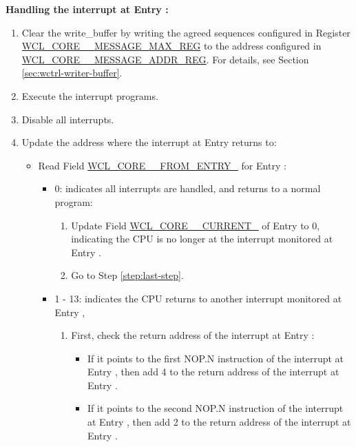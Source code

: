 \documentclass[main\_\_EN.tex]{subfiles}
\begin{document}
\textbf{Handling the interrupt at Entry : \label{step:wctrl-start-interrput}}
    \begin{enumerate}
        \item Clear the write\_buffer by writing the agreed sequences configured in Register \hyperref[regdesc:WCLCORE0MESSAGEMAXREG]{WCL\_CORE\_\_MESSAGE\_MAX\_REG} to the address configured in  \hyperref[regdesc:WCLCORE0MESSAGEADDRREG]{WCL\_CORE\_\_MESSAGE\_ADDR\_REG}. For details, see Section \ref{sec:wctrl-writer-buffer}.
        \item Execute the interrupt programs. \label{step:interrupt-process-normal}
        \item Disable all interrupts.
        \item Update the address where the interrupt at Entry  returns to: \label{step:interrupt_process_update}
        \begin{itemize}
            \item Read Field \hyperref[fielddesc:WCLCORE0FROMENTRYn]{WCL\_CORE\_\_FROM\_ENTRY\_} for Entry :
            \begin{itemize}
                \item 0: indicates all interrupts are handled, and returns to a normal program:
                \begin{enumerate}
                    \item Update Field \hyperref[fielddesc:WCLCORE0CURRENTn]{WCL\_CORE\_\_CURRENT\_} of Entry  to 0, indicating the CPU is no longer at the interrupt monitored at Entry .
                    \item Go to Step \ref{step:last-step}.
                \end{enumerate}
                \item 1 - 13: indicates the CPU returns to another interrupt monitored at Entry ,
                \begin{enumerate}
                    \item First, check the return address of the interrupt at Entry :
                    \begin{itemize}
                        \item If it points to the first NOP.N instruction of the interrupt at Entry , then add 4 to the return address of the interrupt at Entry .
                        \item If it points to the second NOP.N instruction of the interrupt at Entry , then add 2 to the return address of the interrupt at Entry .

\end{itemize}
\end{enumerate}
\end{itemize}
\end{itemize}
\end{enumerate}
\end{document}
